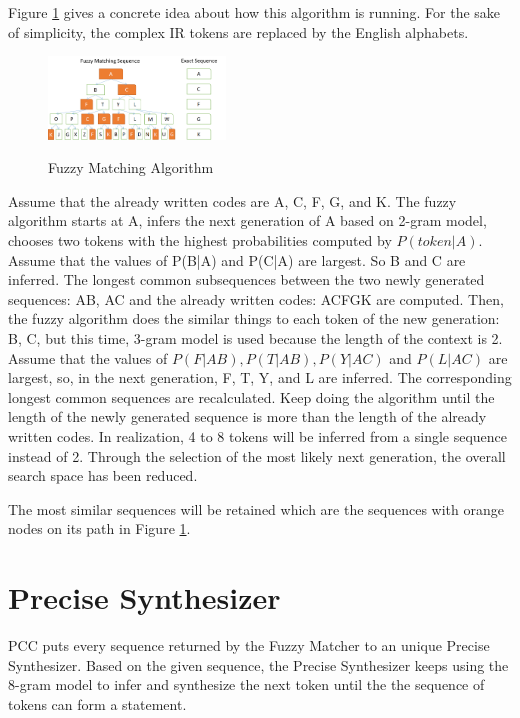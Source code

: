 \documentclass{sig-alternate-05-2015}
\begin{document}
Figure \ref{fuzzymatch} gives a concrete idea about how this algorithm is running. For the sake of simplicity, the complex IR tokens are replaced by the English alphabets.
\begin{figure}[htbp]
  \centering
  \includegraphics[width=0.42\textwidth]{pics/fuzzymatchshow.png}\\
  \caption{Fuzzy Matching Algorithm}\label{fuzzymatch}
\end{figure}
\vspace{-0.25cm}

Assume that the already written codes are A, C, F, G, and K. The fuzzy algorithm starts at A, infers the next generation of A based on 2-gram model, chooses two tokens with the highest probabilities computed by $P(token|A)$. Assume that the values of P(B|A) and P(C|A) are largest. So B and C are inferred. The longest common subsequences between the two newly generated sequences: AB, AC and the already written codes: ACFGK are computed. Then, the fuzzy algorithm does the similar things to each token of the new generation: B, C, but this time, 3-gram model is used because the length of the context is 2. Assume that the values of $P(F|AB), P(T|AB), P(Y|AC)$ and $P(L|AC)$ are largest, so, in the next generation, F, T, Y, and L are inferred. The corresponding longest common sequences are recalculated. Keep doing the algorithm until the length of the newly generated sequence is more than the length of the already written codes. In realization, 4 to 8 tokens will be inferred from a single sequence instead of 2. Through the selection of the most likely next generation, the overall search space has been reduced.

The most similar sequences will be retained which are the sequences with orange nodes on its path in Figure \ref{fuzzymatch}.

\section{Precise Synthesizer}

PCC puts every sequence returned by the Fuzzy Matcher to an unique Precise Synthesizer. Based on the given sequence, the Precise Synthesizer keeps using the 8-gram model to infer and synthesize the next token until the the sequence of tokens can form a statement.
\end{document}

